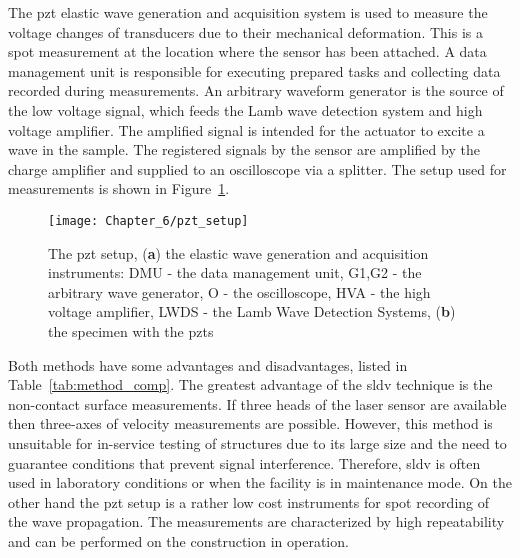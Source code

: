 The \ac{pzt} elastic wave generation and acquisition system is used to measure the voltage changes of transducers due to their mechanical deformation.
This is a spot measurement at the location where the sensor has been attached.
A data management unit is responsible for executing prepared tasks and collecting data recorded during measurements.
An arbitrary waveform generator is the source of the low voltage signal, which feeds the Lamb wave detection system and high voltage amplifier.
The amplified signal is intended for the actuator to excite a wave in the sample.
The registered signals by the sensor are amplified by the charge amplifier and supplied to an oscilloscope via a splitter.
The setup used for measurements is shown in Figure~\ref{fig:pzt_setup}.
\begin{figure}[!htb]
	\begin{center}
		\texttt{[image: Chapter\_6/pzt\_setup]}
	\end{center}
	\caption{The \acl{pzt} setup, (\textbf{a}) the elastic wave generation and acquisition instruments:  DMU - the data management unit, G1,G2 - the arbitrary wave generator, O - the oscilloscope, HVA - the high voltage amplifier, LWDS - the Lamb Wave Detection Systems, (\textbf{b}) the specimen with the \acfp{pzt}}
	\label{fig:pzt_setup}
\end{figure}

Both methods have some advantages and disadvantages, listed in Table~\ref{tab:method_comp}.
The greatest advantage of the \ac{sldv} technique is the non-contact surface measurements.
If three heads of the laser sensor are available then three-axes of velocity measurements are possible.
However, this method is unsuitable for in-service testing of structures due to its large size and the need to guarantee conditions that prevent signal interference. Therefore, \ac{sldv} is often used in laboratory conditions or when the facility is in maintenance mode.
On the other hand the \ac{pzt} setup is a rather low cost instruments for spot recording of the wave propagation.
The measurements are characterized by high repeatability and can be performed on the construction in operation.

